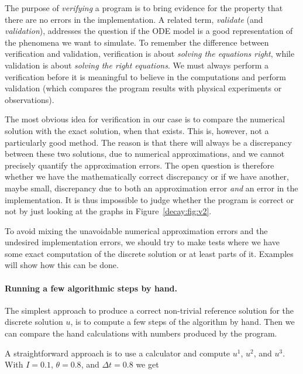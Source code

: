 \documentclass[graybox,sectrefs,envcountresetchap,open=right,final]{svmonodo}
\newenvironment{notice_mdfboxadmon}[1][]{
\begin{notice_mdfboxmdframed}[frametitle=#1]
}
{
\end{notice_mdfboxmdframed}
}
\begin{document}
\begin{notice_mdfboxadmon}
The purpose of \emph{verifying} a program is to bring evidence for the
property that there are no errors in the implementation. A related
term, \emph{validate} (and \emph{validation}),
addresses the question if the ODE model is a good
representation of the phenomena we want to simulate. To remember the
difference between verification and validation, verification is
about \emph{solving the equations right}, while validation is about \emph{solving
the right equations}. We must always perform a verification before
it is meaningful to believe in the computations and perform validation
(which compares the program results with physical experiments or observations).
\end{notice_mdfboxadmon} %



The most obvious idea for verification
in our case is to compare the numerical solution with the exact
solution, when that exists. This is, however, not a particularly good
method. The reason is that there will always
be a discrepancy
between these two solutions, due to numerical
approximations, and we cannot precisely quantify the approximation
errors. The open question is therefore whether we have the
mathematically correct
discrepancy or if we have another, maybe small,
discrepancy due to both an approximation error \emph{and} an error in the
implementation. It is thus
impossible to judge whether the program is correct or not by
just looking at the graphs in Figure~\ref{decay:fig:v2}.

To avoid
mixing the unavoidable numerical approximation errors and the
undesired implementation errors, we should try to make tests where
we have some exact
computation of the discrete solution or at least parts of it.
Examples will show how this can be done.

\paragraph{Running a few algorithmic steps by hand.}
The simplest approach to produce a correct non-trivial reference
solution for the discrete solution $u$, is to compute a few steps of
the algorithm by hand. Then we can compare the hand calculations with
numbers produced by the program.

A straightforward approach is to use a calculator and
compute $u^1$, $u^2$, and $u^3$. With $I=0.1$, $\theta=0.8$,
and $\Delta t =0.8$ we get
\end{document}
